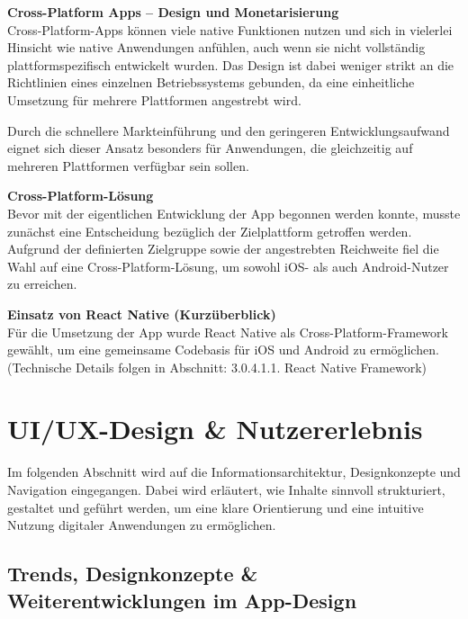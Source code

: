 \vspace{0.5em}
\textbf{Cross-Platform Apps – Design und Monetarisierung}\\
Cross-Platform-Apps können viele native Funktionen nutzen und sich in vielerlei Hinsicht wie native Anwendungen anfühlen, auch wenn sie nicht vollständig plattformspezifisch entwickelt wurden. Das Design ist dabei weniger strikt an die Richtlinien eines einzelnen Betriebssystems gebunden, da eine einheitliche Umsetzung für mehrere Plattformen angestrebt wird.

Durch die schnellere Markteinführung und den geringeren Entwicklungsaufwand eignet sich dieser Ansatz besonders für Anwendungen, die gleichzeitig auf mehreren Plattformen verfügbar sein sollen. \cite{Denvo_Native_vs_Crossplattform} \cite{ITPortal_Native_vs_Crossplattform} \cite{knguru_crossplatform}

\vspace{0.5em}
\textbf{Cross-Platform-Lösung}\\
Bevor mit der eigentlichen Entwicklung der App begonnen werden konnte, musste zunächst eine Entscheidung 
bezüglich der Zielplattform getroffen werden. Aufgrund der definierten Zielgruppe sowie der angestrebten 
Reichweite fiel die Wahl auf eine Cross-Platform-Lösung, um sowohl iOS- als auch Android-Nutzer zu erreichen.


\vspace{0.5em}
\textbf{Einsatz von React Native (Kurzüberblick)}\\
Für die Umsetzung der App wurde React Native als Cross-Platform-Framework gewählt, um eine gemeinsame Codebasis
für iOS und Android zu ermöglichen. (Technische Details folgen in Abschnitt: 3.0.4.1.1. React Native Framework)

\section{UI/UX-Design \& Nutzererlebnis}
Im folgenden Abschnitt wird auf die Informationsarchitektur, Designkonzepte und Navigation eingegangen. Dabei wird erläutert, wie Inhalte sinnvoll strukturiert, gestaltet und geführt werden, um eine klare Orientierung und eine intuitive Nutzung digitaler Anwendungen zu ermöglichen.

\subsection{Trends, Designkonzepte \& Weiterentwicklungen im App-Design}

